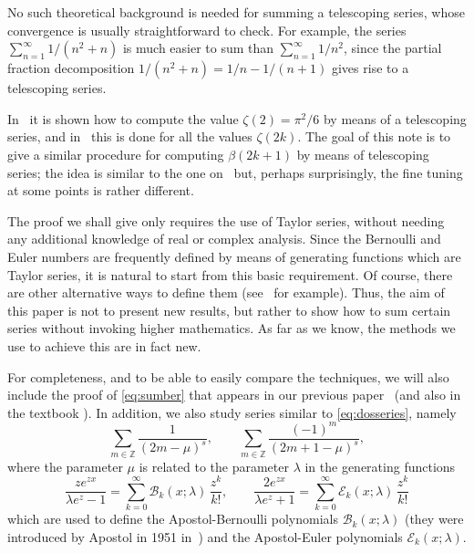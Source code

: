 \documentclass[11pt, oneside]{article}
\newcommand{\Z}{\mathbb{Z}}
\newcommand{\calB}{\mathcal{B}}
\newcommand{\calE}{\mathcal{E}}
\theoremstyle{plain}
\theoremstyle{definition}
\begin{document}
No such theoretical background is needed for summing a telescoping series, whose convergence is usually straightforward to check. For example, the series $\sum_{n=1}^{\infty} 1/(n^2+n)$ is much easier to sum than $\sum_{n=1}^{\infty} 1/n^2$, since the partial fraction decomposition $1/(n^2+n) = 1/n - 1/(n+1)$ gives rise to a telescoping series.


In~\cite{Benko} it is shown how to compute the value $\zeta(2) = \pi^2/6$ by means of a telescoping series, and in~\cite{CNRV} this is done for all the values $\zeta(2k)$. The goal of this note is to give a similar procedure for computing $\beta(2k+1)$ by means of telescoping series; the idea is similar to the one on~\cite{CNRV} but, perhaps surprisingly, the fine tuning at some points is rather different. 

The proof we shall give only requires the use of Taylor series, without needing any additional knowledge of real or complex analysis. Since the Bernoulli and Euler numbers are frequently defined by means of generating functions which are Taylor series, it is natural to start from this basic requirement. Of course, there are other alternative ways to define them (see~\cite{CDG} for example). Thus, the aim of this paper is not to present new results, but rather to show how to sum certain series without invoking higher mathematics. As far as we know, the methods we use to achieve this are in fact new.


For completeness, and to be able to easily compare the techniques, we will also include the proof of \eqref{eq:sumber} that appears in our previous paper~\cite{CNRV} (and also in the textbook \cite[\S\,6.9]{Var}). In addition, we  also study series similar to \eqref{eq:dosseries}, namely
\begin{equation}
\label{eq:summus}
  \sum_{m\in\Z} \frac{1}{(2m-\mu)^s},
  \qquad
  \sum_{m\in\Z} \frac{(-1)^m}{(2m+1-\mu)^s},
\end{equation}
where the parameter $\mu$ is related to the parameter $\lambda$ in the generating functions
\begin{equation*}
  \frac{ze^{zx}}{\lambda e^z-1} = \sum_{k=0}^\infty \calB_k(x;\lambda)\, \frac{z^k}{k!},
  \qquad
  \frac{2e^{zx}}{\lambda e^z+1} = \sum_{k=0}^\infty \calE_k(x;\lambda)\, \frac{z^k}{k!}
\end{equation*}
which are used to define the Apostol-Bernoulli polynomials $\calB_k(x;\lambda)$ (they were introduced by Apostol in 1951 in~\cite{Ap-Lerch, Ap-Lerch-2}) and the Apostol-Euler polynomials $\calE_k(x;\lambda)$.
\end{document}
